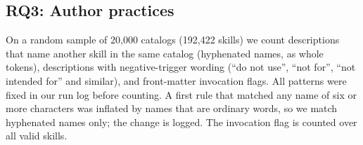 \subsection{RQ3: Author practices}

On a random sample of 20,000 catalogs (192,422 skills) we count descriptions that name another skill in the same catalog (hyphenated names, as whole tokens), descriptions with negative-trigger wording (``do not use'', ``not for'', ``not intended for'' and similar), and front-matter invocation flags. All patterns were fixed in our run log before counting. A first rule that matched any name of six or more characters was inflated by names that are ordinary words, so we match hyphenated names only; the change is logged. The invocation flag is counted over all valid skills.
